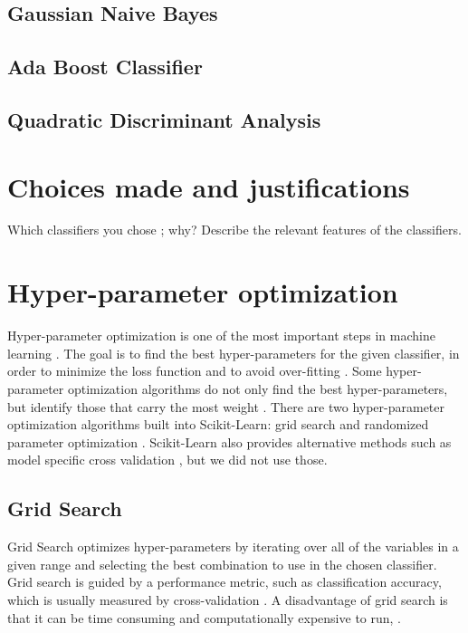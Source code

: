 \documentclass{article}
\begin{document}
	\subsection{Gaussian Naive Bayes}
	
	\subsection{Ada Boost Classifier}
	
	\subsection{Quadratic Discriminant Analysis}

\section{Choices made and justifications}
	Which classifiers you chose ; why?  
	Describe the relevant features of the classifiers.

\newpage
\section{Hyper-parameter optimization}

	Hyper-parameter optimization is one of the most important steps in machine learning \cite{bardenet}. The goal is to find the best hyper-parameters for the given classifier, in order to minimize the loss function and to avoid over-fitting \cite{Bergstra}. Some hyper-parameter optimization algorithms do not only find the best hyper-parameters, but identify those that carry the most weight \cite{Bergstra}.
	There are two hyper-parameter optimization algorithms built into Scikit-Learn: grid search and randomized parameter optimization \cite{gridsearch}. Scikit-Learn also provides alternative methods such as model specific cross validation  \cite{HyperparameterOptimisationWiki}, but we did not use those.  
	
	\subsection{Grid Search}
	
		Grid Search optimizes hyper-parameters by iterating over all of the variables in a given range and selecting the best combination to use in the chosen classifier. Grid search is guided by a performance metric, such as classification accuracy, which is usually measured by cross-validation \cite{HyperparameterOptimisationWiki}. A disadvantage of grid search is that it can be time consuming and computationally expensive to run, \cite{HyperparameterOptimisationWiki}.
\end{document}
